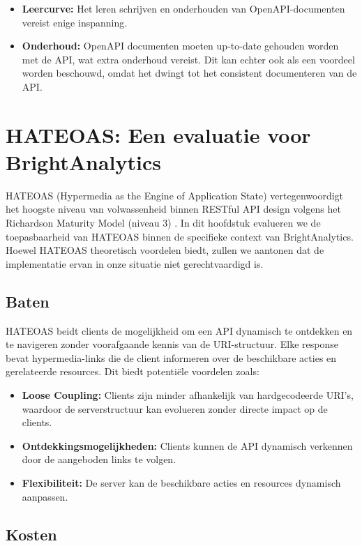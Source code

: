 \begin{itemize}
  \item \textbf{Leercurve:} Het leren schrijven en onderhouden van OpenAPI-documenten vereist enige inspanning.
  \item \textbf{Onderhoud:} OpenAPI documenten moeten up-to-date gehouden worden met de API, wat extra onderhoud vereist. Dit kan echter ook als een voordeel worden beschouwd, omdat het dwingt tot het consistent documenteren van de API.
\end{itemize}

\section{HATEOAS: Een evaluatie voor BrightAnalytics}

HATEOAS (Hypermedia as the Engine of Application State) vertegenwoordigt het hoogste niveau van volwassenheid binnen RESTful API design volgens het Richardson Maturity Model (niveau 3) \autocite{Fowler2010}. In dit hoofdstuk evalueren we de toepasbaarheid van HATEOAS binnen de specifieke context van BrightAnalytics. Hoewel HATEOAS theoretisch voordelen biedt, zullen we aantonen dat de implementatie ervan in onze situatie niet gerechtvaardigd is.

\subsection{Baten}

HATEOAS beidt clients de mogelijkheid om een API dynamisch te ontdekken en te navigeren zonder voorafgaande kennis van de URI-structuur. Elke response bevat hypermedia-links die de client informeren over de beschikbare acties en gerelateerde resources. Dit biedt potentiële voordelen zoals:

\begin{itemize}
  \item \textbf{Loose Coupling:} Clients zijn minder afhankelijk van hardgecodeerde URI's, waardoor de serverstructuur kan evolueren zonder directe impact op de clients.
  \item \textbf{Ontdekkingsmogelijkheden:} Clients kunnen de API dynamisch verkennen door de aangeboden links te volgen.
  \item \textbf{Flexibiliteit:} De server kan de beschikbare acties en resources dynamisch aanpassen.
\end{itemize}

\subsection{Kosten}

